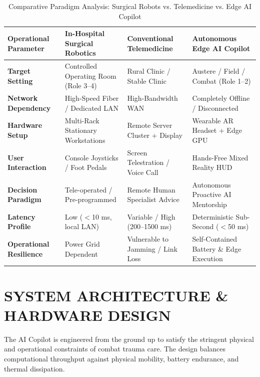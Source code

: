 \documentclass[12pt,a4paper]{report}
\begin{document}
\begin{table}[htbp]
\centering
\caption{Comparative Paradigm Analysis: Surgical Robots vs. Telemedicine vs. Edge AI Copilot}
\label{tab:paradigm_comparison}
\small
\begin{tabularx}{\textwidth}{@{}p{3.2cm} p{3.8cm} p{3.8cm} X@{}}
\toprule
\textbf{Operational Parameter} & \textbf{In-Hospital Surgical Robotics} & \textbf{Conventional Telemedicine} & \textbf{Autonomous Edge AI Copilot} \\
\midrule
\textbf{Target Setting} & Controlled Operating Room (Role 3--4) & Rural Clinic / Stable Clinic & Austere / Field / Combat (Role 1--2) \\
\textbf{Network Dependency} & High-Speed Fiber / Dedicated LAN & High-Bandwidth WAN & Completely Offline / Disconnected \\
\textbf{Hardware Setup} & Multi-Rack Stationary Workstations & Remote Server Cluster + Display & Wearable AR Headset + Edge GPU \\
\textbf{User Interaction} & Console Joysticks / Foot Pedals & Screen Telestration / Voice Call & Hands-Free Mixed Reality HUD \\
\textbf{Decision Paradigm} & Tele-operated / Pre-programmed & Remote Human Specialist Advice & Autonomous Proactive AI Mentorship \\
\textbf{Latency Profile} & Low ($<$10 ms, local LAN) & Variable / High (200--1500 ms) & Deterministic Sub-Second ($<$50 ms) \\
\textbf{Operational Resilience} & Power Grid Dependent & Vulnerable to Jamming / Link Loss & Self-Contained Battery \& Edge Execution \\
\bottomrule
\end{tabularx}
\end{table}

\section{SYSTEM ARCHITECTURE \& HARDWARE DESIGN}

The AI Copilot is engineered from the ground up to satisfy the stringent physical and operational constraints of combat trauma care. The design balances computational throughput against physical mobility, battery endurance, and thermal dissipation.
\end{document}
